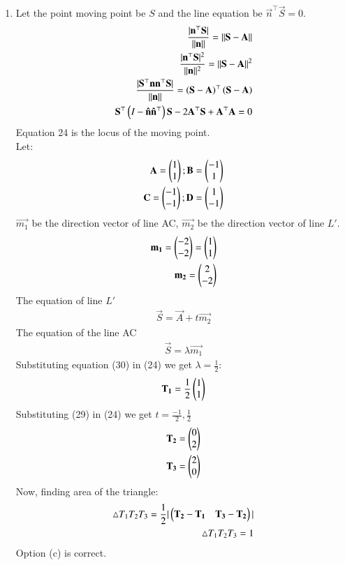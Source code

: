 \documentclass[journal]{IEEEtran}
\begin{document}
\begin{enumerate}
\item Let the point moving point be $S$ and the line equation be $\vec{n}^\top\vec{S}=0$.
\begin{align}
    \frac{|\mathbf{n}^\top\mathbf{S}|}{||\mathbf{n}||}=||\mathbf{S}-\mathbf{A}||\\
    \frac{|\mathbf{n}^\top\mathbf{S}|^2}{||\mathbf{n}||^2}=||\mathbf{S}-\mathbf{A}||^2\\
    \frac{|\mathbf{S}^\top\mathbf{n}\mathbf{n}^\top\mathbf{S}|}{||\mathbf{n}||}=\left(\mathbf{S}-\mathbf{A}\right)^\top\left(\mathbf{S}-\mathbf{A}\right)\\
    \mathbf{S}^\top\left(I-\mathbf{\hat{n}}\mathbf{\hat{n}}^\top\right)\mathbf{S}-2\mathbf{A}^\top\mathbf{S}+\mathbf{A}^\top\mathbf{A}=0
\end{align}
Equation 24 is the locus of the moving point.\\
Let:
\begin{align}
    \mathbf{A}=\begin{pmatrix}1\\1\end{pmatrix};\mathbf{B}=\begin{pmatrix}-1\\1\end{pmatrix}\\
    \mathbf{C}=\begin{pmatrix}-1\\-1\end{pmatrix};\mathbf{D}=\begin{pmatrix}1\\-1\end{pmatrix}
\end{align}
$\vec{m_1}$ be the direction vector of line AC, $\vec{m_2}$ be the direction vector of line $L'$.
\begin{align}
    \mathbf{m_1} = \begin{pmatrix}-2\\-2\end{pmatrix}=\begin{pmatrix}1\\1\end{pmatrix}\\
    \mathbf{m_2} = \begin{pmatrix}2\\-2\end{pmatrix}
\end{align}
The equation of line $L'$ 
\begin{align} \vec{S}=\vec{A}+t\vec{m_2}\end{align}
The equation of the line AC
\begin{align}
\vec{S}=\lambda \vec{m_1}
\end{align}
Substituting equation (30) in (24) we get $\lambda=\frac{1}{2}$:
\begin{align}
    \mathbf{T_1}=\frac{1}{2}\begin{pmatrix}1\\1\end{pmatrix}
\end{align}
Substituting (29) in (24) we get $t=\frac{-1}{2},\frac{1}{2}$
\begin{align}
    \mathbf{T_2}=\begin{pmatrix}0\\2\end{pmatrix}\\
    \mathbf{T_3}=\begin{pmatrix}2\\0\end{pmatrix}
\end{align}
Now, finding area of the triangle:
\begin{align}
    \triangle T_1T_2T_3=\frac{1}{2}|\begin{pmatrix}\mathbf{T_2}-\mathbf{T_1}&\mathbf{T_3}-\mathbf{T_2}\end{pmatrix}|\\
    \triangle T_1T_2T_3 = 1
\end{align}
Option (c) is correct.



\end{enumerate}
\end{document}
